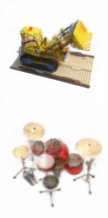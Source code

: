 \documentclass{article}
\begin{document}
\begin{figure}[!h]
 \centering

\begin{subfigure}{.24\textwidth}
  \centering
  \includegraphics[width=\linewidth]{figs/results/lego.png}  
\end{subfigure}
\begin{subfigure}{.24\textwidth}
  \centering
  \includegraphics[width=\linewidth]{figs/results/drums.png}  

\end{subfigure}
\end{figure}
\end{document}

